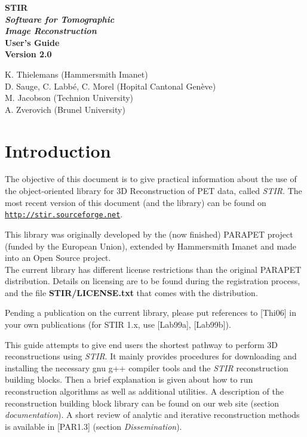 \documentclass{article}
\def\R2Lurl#1#2{\mbox{\href{#1}{\tt #2}}}
\begin{document}
\begin{spacing}{2}
\begin{center}

\textbf{
{\Huge  STIR} 
\huge
\\[1cm]
\textit{ Software for  Tomographic \\ Image Reconstruction}
}
\\[3cm]

\textbf{{\huge User's Guide\\
 Version 2.0}}
\end{center}

\end{spacing}

\large 

\noindent 
K. Thielemans (Hammersmith Imanet)\\
D. Sauge, C. Labb\'e, C. Morel (Hopital Cantonal Gen\`eve)\\
M. Jacobson (Technion University)\\
A. Zverovich (Brunel University)



\newpage

\tableofcontents


\section{
Introduction}

The objective of this document is to give practical information 
about the use of the object-oriented library for 3D Reconstruction 
of PET data, called \textit{STIR}. The most recent version of this 
document (and the library) can be found on \\
\R2Lurl{http://stir.sourceforge.net}{http://stir.sourceforge.net}.


This library was originally developed by the (now finished) PARAPET 
project (funded by the European Union), extended by Hammersmith 
Imanet and made into an Open Source project. \\
The current library has different license restrictions than the 
original PARAPET distribution. Details on licensing are to be 
found during the registration process, and the file \textbf{STIR/LICENSE.txt} 
that comes with the distribution. 


Pending a publication on the current library, please put references 
to {[}Thi06{]} in your own publications (for STIR 1.x, use [Lab99a], [Lab99b]).



This guide attempts to give end users the shortest pathway to 
perform 3D reconstructions using \textit{STIR}. It mainly provides 
procedures for downloading and installing the necessary gnu g++ 
compiler tools and the \textit{STIR} reconstruction building blocks. 
Then a brief explanation is given about how to run reconstruction 
algorithms as well as additional utilities. A description of 
the reconstruction building block library can be found on our 
web site (section \textit{documentation}). A short review of analytic 
and iterative reconstruction methods is available in [PAR1.3] 
(section \textit{Dissemination}).
\end{document}
